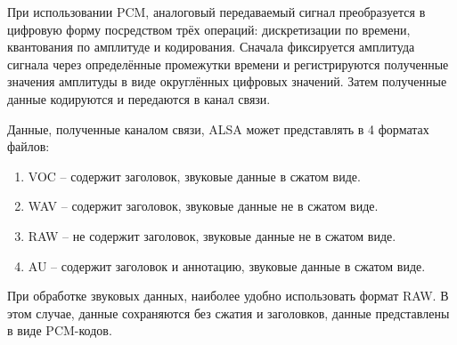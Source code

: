 При использовании PCM, аналоговый передаваемый сигнал преобразуется в цифровую форму посредством трёх операций: дискретизации по времени, квантования по амплитуде и кодирования. Сначала фиксируется амплитуда сигнала через определённые промежутки времени и регистрируются полученные значения амплитуды в виде округлённых цифровых значений. Затем полученные данные кодируются и передаются в канал связи.

Данные, полученные каналом связи, ALSA может представлять в 4 форматах файлов:

\begin{enumerate}
  \item VOC -- содержит заголовок, звуковые данные в сжатом виде.
  \item WAV -- содержит заголовок, звуковые данные не в сжатом виде.
  \item RAW -- не содержит заголовок, звуковые данные не в сжатом виде.
  \item AU -- содержит заголовок и аннотацию, звуковые данные в сжатом виде.
\end{enumerate}

При обработке звуковых данных, наиболее удобно использовать формат RAW. В этом случае, данные сохраняются без сжатия и заголовков, данные представлены в виде PCM-кодов.